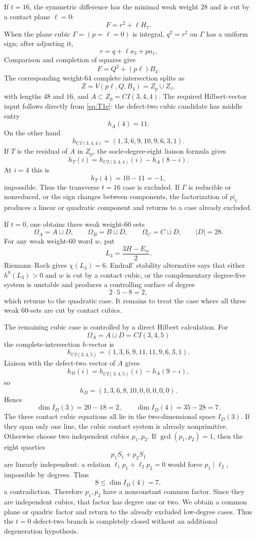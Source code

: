 \documentclass[11pt,reqno]{amsart}
\theoremstyle{remark}
\begin{document}
If $t=16$, the symmetric difference has the minimal weak weight $28$ and is cut by a contact plane $\ell=0$:
\[
F=r^2+\ell H_7.
\]
When the plane cubic $\Gamma=(p=\ell=0)$ is integral, $q^2=r^2$ on $\Gamma$ has a uniform sign; after adjusting it,
\[
r=q+\ell a_3+pa_1.
\]
Comparison and completion of squares give
\[
F=Q^2+(p\ell)B_4.
\]
The corresponding weight-$64$ complete intersection splits as
\[
Z=V(p\ell,Q,B_4)=Z_p\cup Z_\ell,
\]
with lengths $48$ and $16$, and $A\subset Z_p=CI(3,4,4)$.  The required Hilbert-vector input follows directly from \eqref{eq:T1e}: the defect-two cubic candidate has middle entry
\[
h_A(4)=11.
\]
On the other hand
\[
h_{CI(3,4,4)}=(1,3,6,9,10,9,6,3,1).
\]
If $T$ is the residual of $A$ in $Z_p$, the socle-degree-eight liaison formula gives
\[
h_T(i)=h_{CI(3,4,4)}(i)-h_A(8-i).
\]
At $i=4$ this is
\[
h_T(4)=10-11=-1,
\]
impossible.  Thus the transverse $t=16$ case is excluded.  If $\Gamma$ is reducible or nonreduced, or the sign changes between components, the factorization of $p|_\ell$ produces a linear or quadratic component and returns to a case already excluded.

If $t=0$, one obtains three weak weight-$60$ sets
\[
\Omega_A=A\sqcup D,
\qquad
\Omega_B=B\sqcup D,
\qquad
\Omega_C=C\sqcup D,
\qquad |D|=28.
\]
For any weak weight-$60$ word $w$, put
\[
L_3=\frac{3H-E_w}{2}.
\]
Riemann--Roch gives $\chi(L_3)=6$.  Endra\ss' stability alternative says that either $h^0(L_3)>0$ and $w$ is cut by a contact cubic, or the complementary degree-five system is unstable and produces a controlling surface of degree
\[
2\cdot5-8=2,
\]
which returns to the quadratic case.  It remains to treat the case where all three weak $60$-sets are cut by contact cubics.

The remaining cubic case is controlled by a direct Hilbert calculation.  For
\[
\Omega_A=A\sqcup D=CI(3,4,5)
\]
the complete-intersection $h$-vector is
\[
h_{CI(3,4,5)}=(1,3,6,9,11,11,9,6,3,1).
\]
Liaison with the defect-two vector of $A$ gives
\[
h_D(i)=h_{CI(3,4,5)}(i)-h_A(9-i),
\]
so
\[
\boxed{h_D=(1,3,6,8,10,0,0,0,0,0).} \tag{T10}\label{eq:T10}
\]
Hence
\[
\dim I_D(3)=20-18=2,
\qquad
\dim I_D(4)=35-28=7. \tag{T11}\label{eq:T11}
\]
The three contact cubic equations all lie in the two-dimensional space $I_D(3)$.  If they span only one line, the cubic contact system is already nonprimitive.  Otherwise choose two independent cubics $p_1,p_2$.  If $\gcd(p_1,p_2)=1$, then the eight quartics
\[
p_1S_1+p_2S_1
\]
are linearly independent: a relation $\ell_1p_1+\ell_2p_2=0$ would force $p_1\mid\ell_2$, impossible by degrees.  Thus
\[
8\le\dim I_D(4)=7,
\]
a contradiction.  Therefore $p_1,p_2$ have a nonconstant common factor.  Since they are independent cubics, that factor has degree one or two.  We obtain a common plane or quadric factor and return to the already excluded low-degree cases.  Thus the $t=0$ defect-two branch is completely closed without an additional degeneration hypothesis.
\end{document}
